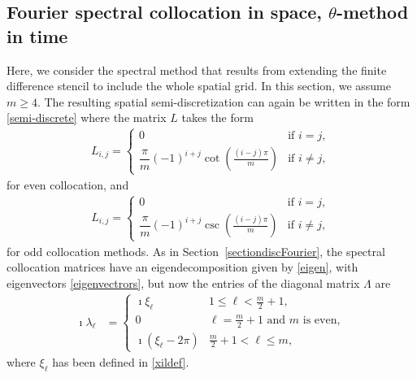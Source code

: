 \documentclass[a4paper]{article}
\begin{document}
\subsection{Fourier spectral collocation in space, \texorpdfstring{$\theta$}{}-method in time}\label{spectrcoll}
Here, we consider the spectral method that results from extending the
finite difference stencil to include the whole spatial grid.  In this section, we assume $m\ge 4$. The resulting spatial 
semi-discretization can again be written in the form \eqref{semi-discrete}
where the matrix $L$ takes the form \cite{trefethen,peyret}
\begin{align*}
	L_{i,j} = \begin{cases}
						0 & \text{if } i = j, \\[10pt]
						\dfrac{\pi}{m}(-1)^{i+j}\cot{\!\left(\frac{(i-j)\pi}{m}\right)} & \text{if } i \neq j,
					\end{cases}
\end{align*}
for even collocation, and
\begin{align*}
	L_{i,j} = \begin{cases}
						0 & \text{if } i = j, \\[10pt]
						\dfrac{\pi}{m}(-1)^{i+j}\csc{\!\left(\frac{(i-j)\pi}{m}\right)} & \text{if } i \neq j,
					\end{cases}
\end{align*}
for odd collocation methods.
As in Section~\ref{sectiondiscFourier}, the spectral collocation matrices have an eigendecomposition given by
\eqref{eigen}, with eigenvectors \eqref{eigenvectrors}, but now the entries of the diagonal matrix $\Lambda$ are
\begin{align}
    \imath\lambda_\ell & =
    \begin{cases}
        \imath\xi_\ell & 1 \le \ell < \frac{m}{2}+1, \\
        0 & \ell = \frac{m}{2}+1 \text{ and } m \text{ is even}, \\ \nonumber
        \imath(\xi_\ell - 2\pi) & \frac{m}{2}+1 < \ell \le m,
    \end{cases}
\end{align}
where $\xi_\ell$ has been defined in \eqref{xildef}.
\end{document}

